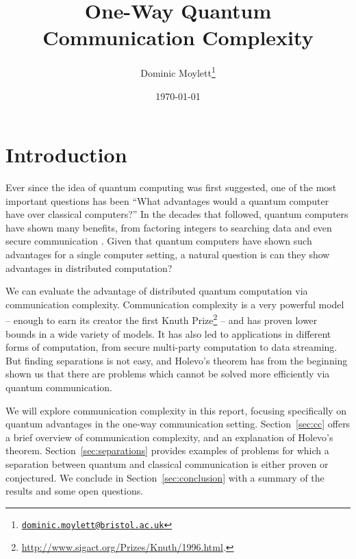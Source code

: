 \documentclass[a4paper]{article}
\begin{document}
    \title{One-Way Quantum Communication Complexity}
    \author{Dominic Moylett\thanks{\texttt{\href{dominic.moylett@bristol.ac.uk}{dominic.moylett@bristol.ac.uk}}}}
    \date{\today}
    \maketitle

    \section{Introduction}

        Ever since the idea of quantum computing was first suggested, one of the most important questions has been ``What advantages would a quantum computer have over classical computers?'' In the decades that followed, quantum computers have shown many benefits, from factoring integers \cite{Shor:1997:PAP:264393.264406} to searching data \cite{Grover:1996:FQM:237814.237866} and even secure communication \cite{Bennett20147}. Given that quantum computers have shown such advantages for a single computer setting, a natural question is can they show advantages in distributed computation?

        We can evaluate the advantage of distributed quantum computation via communication complexity. Communication complexity is a very powerful model -- enough to earn its creator the first Knuth Prize\footnote{\url{http://www.sigact.org/Prizes/Knuth/1996.html}.} -- and has proven lower bounds in a wide variety of models. It has also led to applications in different forms of computation, from secure multi-party computation to data streaming. But finding separations is not easy, and Holevo's theorem has from the beginning shown us that there are problems which cannot be solved more efficiently via quantum communication.

        We will explore communication complexity in this report, focusing specifically on quantum advantages in the one-way communication setting. Section~\ref{sec:cc} offers a brief overview of communication complexity, and an explanation of Holevo's theorem. Section~\ref{sec:separations} provides examples of problems for which a separation between quantum and classical communication is either proven or conjectured. We conclude in Section~\ref{sec:conclusion} with a summary of the results and some open questions.
\end{document}
